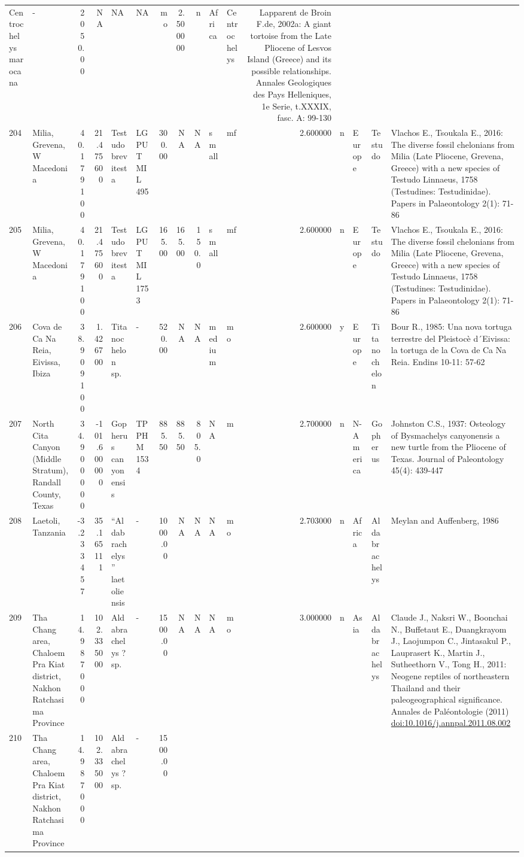 \documentclass[]{article}
\begin{document}
\begin{longtable}[]{@{}llrrllrrrllrllll@{}}
Centrochelys marocana & - & 2050.00 & NA & NA & NA & mo & 2.500000 & n &
Africa & Centrochelys & Lapparent de Broin F.de, 2002a: A giant tortoise
from the Late Pliocene of Lesvos Island (Greece) and its possible
relationships. Annales Geologiques des Pays Helleniques, 1e Serie,
t.XXXIX, fasc. A: 99-130\tabularnewline
204 & Milia, Grevena, W Macedonia & 40.179100 & 21.475600 & Testudo
brevitesta & LGPUT MIL 495 & 300.00 & NA & NA & small & mf & 2.600000 &
n & Europe & Testudo & Vlachos E., Tsoukala E., 2016: The diverse fossil
chelonians from Milia (Late Pliocene, Grevena, Greece) with a new
species of Testudo Linnaeus, 1758 (Testudines: Testudinidae). Papers in
Palaeontology 2(1): 71-86\tabularnewline
205 & Milia, Grevena, W Macedonia & 40.179100 & 21.475600 & Testudo
brevitesta & LGPUT MIL 1753 & 165.00 & 165.00 & 150.0 & small & mf &
2.600000 & n & Europe & Testudo & Vlachos E., Tsoukala E., 2016: The
diverse fossil chelonians from Milia (Late Pliocene, Grevena, Greece)
with a new species of Testudo Linnaeus, 1758 (Testudines: Testudinidae).
Papers in Palaeontology 2(1): 71-86\tabularnewline
206 & Cova de Ca Na Reia, Eivissa, Ibiza & 38.909100 & 1.426700 &
Titanochelon sp. & - & 520.00 & NA & NA & medium & mo & 2.600000 & y &
Europe & Titanochelon & Bour R., 1985: Una nova tortuga terrestre del
Pleistocè d´Eivissa: la tortuga de la Cova de Ca Na Reia. Endins 10-11:
57-62\tabularnewline
207 & North Cita Canyon (Middle Stratum), Randall County, Texas &
34.900000 & -101.600000 & Gopherus canyonensis & TPPHM 1534 & 885.50 &
885.50 & 805.0 & NA & m & 2.700000 & n & N-America & Gopherus & Johnston
C.S., 1937: Osteology of Bysmachelys canyonensis a new turtle from the
Pliocene of Texas. Journal of Paleontology 45(4): 439-447\tabularnewline
208 & Laetoli, Tanzania & -3.233457 & 35.165111 & ``Aldabrachelys''
laetoliensis & - & 1000.00 & NA & NA & NA & mo & 2.703000 & n & Africa &
Aldabrachelys & Meylan and Auffenberg, 1986\tabularnewline
209 & Tha Chang area, Chaloem Pra Kiat district, Nakhon Ratchasima
Province & 14.987000 & 102.335000 & Aldabrachelys ? sp. & - & 1500.00 &
NA & NA & NA & mo & 3.000000 & n & Asia & Aldabrachelys & Claude J.,
Naksri W., Boonchai N., Buffetaut E., Duangkrayom J., Laojumpon C.,
Jintasakul P., Lauprasert K., Martin J., Sutheethorn V., Tong H., 2011:
Neogene reptiles of northeastern Thailand and their paleogeographical
significance. Annales de Paléontologie (2011)
\url{doi:10.1016/j.annpal.2011.08.002}\tabularnewline
210 & Tha Chang area, Chaloem Pra Kiat district, Nakhon Ratchasima
Province & 14.987000 & 102.335000 & Aldabrachelys ? sp. & - & 1500.00 &

\end{longtable}
\end{document}
